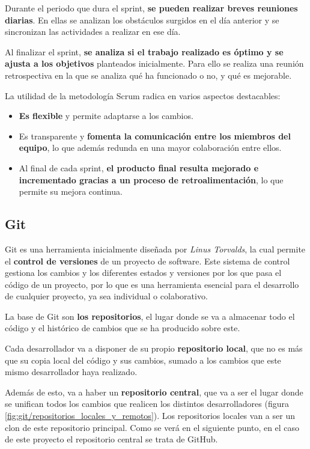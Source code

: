 Durante el periodo que dura el sprint, \textbf{se pueden realizar breves reuniones diarias}. En ellas se analizan los obstáculos surgidos en el día anterior y se sincronizan las actividades a realizar en ese día.

Al finalizar el sprint, \textbf{se analiza si el trabajo realizado es óptimo y se ajusta a los objetivos} planteados inicialmente. Para ello se realiza una reunión retrospectiva en la que se analiza qué ha funcionado o no, y qué es mejorable.

La utilidad de la metodología Scrum radica en varios aspectos destacables:
\begin{itemize}
  \item \textbf{Es flexible} y permite adaptarse a los cambios.
  \item Es transparente y \textbf{fomenta la comunicación entre los miembros del equipo}, lo que además redunda en una mayor colaboración entre ellos.
  \item Al final de cada sprint, \textbf{el producto final resulta mejorado e incrementado gracias a un proceso de retroalimentación}, lo que permite su mejora continua.
\end{itemize}

\subsection{Git}

Git es una herramienta inicialmente diseñada por \textit{Linus Torvalds}, la cual permite el \textbf{control de versiones} de un proyecto de software. Este sistema de control gestiona los cambios y los diferentes estados y versiones por los que pasa el código de un proyecto, por lo que es una herramienta esencial para el desarrollo de cualquier proyecto, ya sea individual o colaborativo. \cite{atlassian:git}

La base de Git son \textbf{los repositorios}, el lugar donde se va a almacenar todo el código y el histórico de cambios que se ha producido sobre este. 

Cada desarrollador va a disponer de su propio \textbf{repositorio local}, que no es más que su copia local del código y sus cambios, sumado a los cambios que este mismo desarrollador haya realizado. 

Además de esto, va a haber un \textbf{repositorio central}, que va a ser el lugar donde se unifican todos los cambios que realicen los distintos desarrolladores (figura \ref{fig:git/repositorios_locales_y_remotos}). Los repositorios locales van a ser un clon de este repositorio principal. Como se verá en el siguiente punto, en el caso de este proyecto el repositorio central se trata de GitHub.

